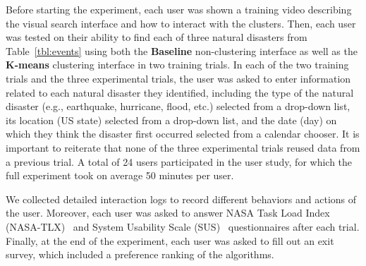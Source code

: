 Before starting the experiment, each user was shown a training video describing the visual search interface and how to interact with the clusters.  Then, each user was tested on their ability to find each of three natural disasters from Table~\ref{tbl:events} 
using both the {\bf Baseline} non-clustering interface as well as the {\bf $\mathbf{K}$-means} clustering interface in two training trials.
In each of the two training trials and the three experimental trials, the user was asked to enter information related to each natural disaster they identified, including the type of the natural disaster (e.g., earthquake, hurricane, flood, etc.) selected from a drop-down list, its location (US state) selected from a drop-down list, and the date (day) on which they think the disaster first occurred selected from a calendar chooser.
It is important to reiterate that none of the three experimental trials reused data from a previous trial.
A total of 24 users participated in the user study, for which the full experiment 
took on average 50 minutes per user.

We collected detailed interaction logs to record different behaviors and actions of the user. Moreover, each user was asked to answer NASA Task Load Index (NASA-TLX)~\cite{HART1988139} and System Usability Scale (SUS)~\cite{brooke1996sus} questionnaires after each trial. Finally, at the end of the experiment, each user was asked to fill out an exit survey, which included a preference ranking of the algorithms.




